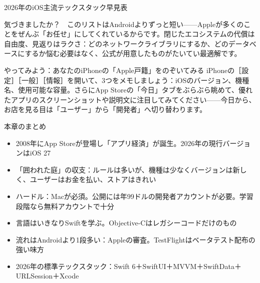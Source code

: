 \begin{center}\small\color{gray}2026年のiOS主流テックスタック早見表\end{center}

気づきましたか？　このリストはAndroidよりずっと短い——Appleが多くのことをぜんぶ「お任せ」にしてくれているからです。閉じたエコシステムの代償は自由度、見返りはラクさ：どのネットワークライブラリにするか、どのデータベースにするか悩む必要はなく、公式が用意したものがたいてい最適解です。

\begin{tcbpractice}{やってみよう：あなたのiPhoneの「Apple戸籍」をのぞいてみる}
iPhoneの［設定］［一般］［情報］を開いて、3つをメモしましょう：iOSのバージョン、機種名、使用可能な容量。さらにApp Storeの「今日」タブをぶらぶら眺めて、優れたアプリのスクリーンショットや説明文に注目してみてください——今日から、お店を見る目は「ユーザー」から「開発者」へ切り替わります。

\end{tcbpractice}

\begin{tcbsummary}{本章のまとめ}
\begin{itemize}
  \item 2008年にApp Storeが登場し「アプリ経済」が誕生。2026年の現行バージョンはiOS 27
  \item 「囲われた庭」の収支：ルールは多いが、機種は少なくバージョンは新しく、ユーザーはお金を払い、ストアはきれい
  \item ハードル：Macが必須。公開には年99ドルの開発者アカウントが必要。学習段階なら無料アカウントで十分
  \item 言語はいきなりSwiftを学ぶ。Objective-Cはレガシーコードだけのもの
  \item 流れはAndroidより1段多い：Appleの審査。TestFlightはベータテスト配布の強い味方
  \item 2026年の標準テックスタック：Swift 6＋SwiftUI＋MVVM＋SwiftData＋URLSession＋Xcode
\end{itemize}

\end{tcbsummary}
